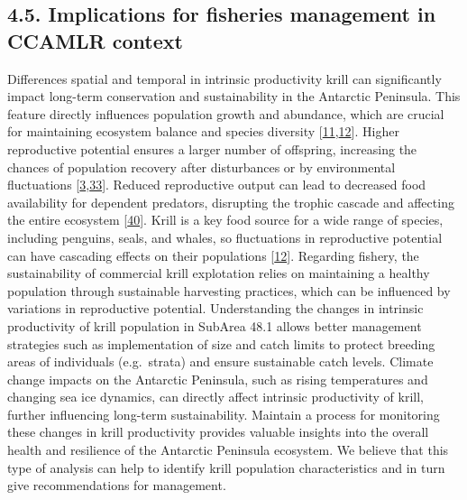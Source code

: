 \documentclass[
]{article}
\begin{document}
\hypertarget{implications-for-fisheries-management-in-ccamlr-context}{%
\subsection{4.5. Implications for fisheries management in CCAMLR
context}\label{implications-for-fisheries-management-in-ccamlr-context}}

Differences spatial and temporal in intrinsic productivity krill can
significantly impact long-term conservation and sustainability in the
Antarctic Peninsula. This feature directly influences population growth
and abundance, which are crucial for maintaining ecosystem balance and
species diversity
{[}\protect\hyperlink{ref-Hill2016}{11},\protect\hyperlink{ref-McBride2021}{12}{]}.
Higher reproductive potential ensures a larger number of offspring,
increasing the chances of population recovery after disturbances or by
environmental fluctuations
{[}\protect\hyperlink{ref-Saba2014}{3},\protect\hyperlink{ref-Pinones2016}{33}{]}.
Reduced reproductive output can lead to decreased food availability for
dependent predators, disrupting the trophic cascade and affecting the
entire ecosystem {[}\protect\hyperlink{ref-Kruger2019}{40}{]}. Krill is
a key food source for a wide range of species, including penguins,
seals, and whales, so fluctuations in reproductive potential can have
cascading effects on their populations
{[}\protect\hyperlink{ref-McBride2021}{12}{]}. Regarding fishery, the
sustainability of commercial krill explotation relies on maintaining a
healthy population through sustainable harvesting practices, which can
be influenced by variations in reproductive potential. Understanding the
changes in intrinsic productivity of krill population in SubArea 48.1
allows better management strategies such as implementation of size and
catch limits to protect breeding areas of individuals (e.g.~strata) and
ensure sustainable catch levels. Climate change impacts on the Antarctic
Peninsula, such as rising temperatures and changing sea ice dynamics,
can directly affect intrinsic productivity of krill, further influencing
long-term sustainability. Maintain a process for monitoring these
changes in krill productivity provides valuable insights into the
overall health and resilience of the Antarctic Peninsula ecosystem. We
believe that this type of analysis can help to identify krill population
characteristics and in turn give recommendations for management.
\end{document}
